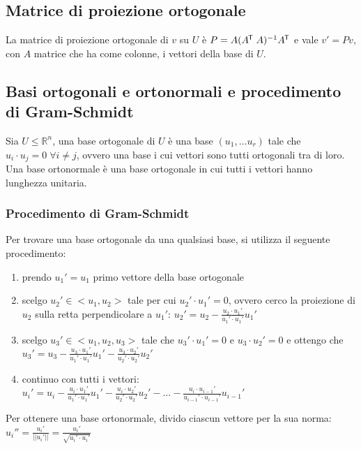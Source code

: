 \documentclass[a4paper]{article}
\newcommand\tran{^{\mkern-1.5mu\mathsf{T}}} %
\begin{document}
\subsection{Matrice di proiezione ortogonale}
La matrice di proiezione ortogonale di \(v\) su \(U\) è \(P = A(A \tran \; A)^{-1} A \tran\) e vale \(v' = P v\), con \(A\) matrice
che ha come colonne, i vettori della base di \(U\).

\subsection{Basi ortogonali e ortonormali e procedimento di Gram-Schmidt}
Sia \(U \leq \mathbb{R}^n\), una base ortogonale di \(U\) è una base \((u_1, \dots u_r)\) tale che \(u_i \cdot u_j = 0 \; \forall i \neq j\),
ovvero una base i cui vettori sono tutti ortogonali tra di loro. \\
Una base ortonormale è una base ortogonale in cui tutti i vettori hanno lunghezza unitaria.

\subsubsection*{Procedimento di Gram-Schmidt}
Per trovare una base ortogonale da una qualsiasi base, si utilizza il seguente procedimento:
\begin{enumerate}[topsep=3pt, itemsep=0pt]
	\item prendo \(u_1' = u_1\) primo vettore della base ortogonale
	\item scelgo \(u_2' \in <u_1, u_2>\) tale per cui \(u_2' \cdot u_1' = 0\), ovvero cerco la proiezione di \(u_2\) sulla retta
	perpendicolare a \(u_1'\): \(\displaystyle u_2' = u_2 - \frac{u_2 \cdot u_1'}{u_1' \cdot u_1'} u_1'\)
	\item scelgo \(u_3' \in <u_1, u_2, u_3>\) tale che \(u_3' \cdot u_1' = 0\) e \(u_3 \cdot u_2' = 0\) e ottengo che
	\(\displaystyle u_3' = u_3 - \frac{u_3 \cdot u_1'}{u_1' \cdot u_1'} u_1' - \frac{u_3 \cdot u_2'}{u_2' \cdot u_2'} u_2'\)
	\item continuo con tutti i vettori: \(\displaystyle u_i' = u_i - \frac{u_i \cdot u_1'}{u_1' \cdot u_1'} u_1' - \frac{u_i \cdot u_2'}{u_2' \cdot u_2'} u_2' - \dots - \frac{u_i \cdot u_{i-1}'}{u_{i-1}' \cdot u_{i-1}'} u_{i-1}'\)
\end{enumerate}
Per ottenere una base ortonormale, divido ciascun vettore per la sua norma: \(\displaystyle u_i'' = \frac{u_i'}{||u_i'||} = \frac{ u_i'}{\sqrt{u_i' \cdot u_i'}}\)
\end{document}
